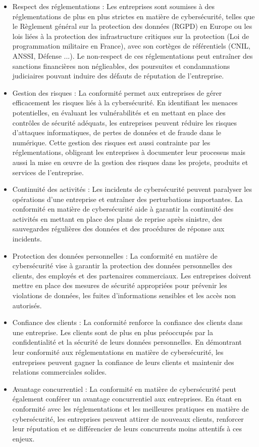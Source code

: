 \begin{itemize}
	\item Respect des réglementations : Les entreprises sont soumises à des réglementations de plus en plus strictes en matière de cybersécurité, telles que le Règlement général sur la protection des données (RGPD) en Europe ou les lois liées à la protection des infrastructure critiques sur la protection (Loi de programmation militaire en France), avec son cortèges de référentiels (CNIL, ANSSI, Défense ...). Le non-respect de ces réglementations peut entraîner des sanctions financières non néglieables, des poursuites et condamnations judiciaires pouvant induire des défauts de réputation de l'entreprise.
	\item Gestion des risques : La conformité permet aux entreprises de gérer efficacement les risques liés à la cybersécurité. En identifiant les menaces potentielles, en évaluant les vulnérabilités et en mettant en place des contrôles de sécurité adéquats, les entreprises peuvent réduire les risques d'attaques informatiques, de pertes de données et de fraude dans le numérique. Cette gestion des risques est aussi contrainte par les réglementations, obligeant les entreprises à documenter leur processus mais aussi la mise en œuvre de la gestion des risques dans les projets, produits et services de l'entreprise.
	\item Continuité des activités : Les incidents de cybersécurité peuvent paralyser les opérations d'une entreprise et entraîner des perturbations importantes. La conformité en matière de cybersécurité aide à garantir la continuité des activités en mettant en place des plans de reprise après sinistre, des sauvegardes régulières des données et des procédures de réponse aux incidents.
	\item Protection des données personnelles : La conformité en matière de cybersécurité vise à garantir la protection des données personnelles des clients, des employés et des partenaires commerciaux. Les entreprises doivent mettre en place des mesures de sécurité appropriées pour prévenir les violations de données, les fuites d'informations sensibles et les accès non autorisés.
	\item Confiance des clients : La conformité renforce la confiance des clients dans une entreprise. Les clients sont de plus en plus préoccupés par la confidentialité et la sécurité de leurs données personnelles. En démontrant leur conformité aux réglementations en matière de cybersécurité, les entreprises peuvent gagner la confiance de leurs clients et maintenir des relations commerciales solides.
	\item Avantage concurrentiel : La conformité en matière de cybersécurité peut également conférer un avantage concurrentiel aux entreprises. En étant en conformité avec les réglementations et les meilleures pratiques en matière de cybersécurité, les entreprises peuvent attirer de nouveaux clients, renforcer leur réputation et se différencier de leurs concurrents moins attentifs à ces enjeux.
	
\end{itemize}

